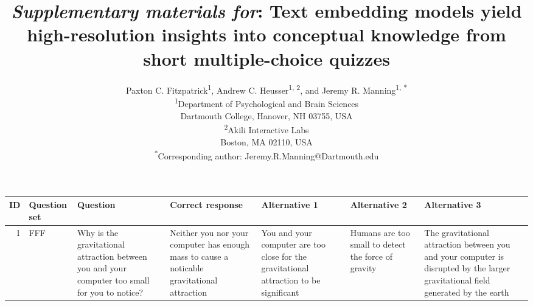\documentclass[10pt]{article}
\title{\textit{Supplementary materials for}: Text embedding models yield 
high-resolution insights into conceptual knowledge from short multiple-choice
quizzes}
\author{Paxton C. Fitzpatrick\textsuperscript{1},
Andrew C. Heusser\textsuperscript{1, 2}, and Jeremy R.
Manning\textsuperscript{1, *}\\\small{\textsuperscript{1}Department of Psychological and Brain Sciences}\\\small{Dartmouth College, Hanover, NH 03755, USA}\\\small{\textsuperscript{2}Akili Interactive Labs}\\\small{Boston, MA 02110, USA}\\\small{\textsuperscript{*}Corresponding author:
Jeremy.R.Manning@Dartmouth.edu}}
\date{}
\begin{document}
\renewcommand{\figurename}{Supplementary Figure}
\renewcommand{\tablename}{Supplementary Table}


\setcounter{equation}{0}
\setcounter{figure}{0}
\setcounter{table}{0}
\setcounter{page}{1}
\setcounter{section}{0}
\makeatletter


\begin{titlepage}
\maketitle
\end{titlepage}


\begin{tiny}
\renewcommand*{\arraystretch}{1.4}
\begin{longtable}{|r|p{0.375in}|p{1.275in}|p{0.75in}|p{0.75in}|p{0.75in}|p{0.75in}|}
\hline
    \textbf{ID} & \textbf{Question set} &                                                                                                                                                                                                                                                                         \textbf{Question} &                                                                                                                                     \textbf{Correct response} &                                                                                                     \textbf{Alternative 1} &                                                                                                                          \textbf{Alternative 2} &                                                                                                                                 \textbf{Alternative 3} \\\hline
    1     &     FFF &                                                                                                                                                                                   Why is the gravitational attraction between you and your computer too small for you to notice? &                                           Neither you nor your computer has enough mass to cause a noticable gravitational attraction &                You and your computer are too close for the gravitational attraction to be significant &                                                                        Humans are too small to detect the force of gravity &  The gravitational attraction between you and your computer is disrupted by the larger gravitational field generated by the earth \\\hline

\end{longtable}
\end{tiny}
\end{document}
